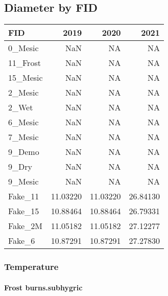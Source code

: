 \documentclass[
]{article}
\begin{document}
\hypertarget{diameter-by-fid-1}{%
\subsection{Diameter by FID}\label{diameter-by-fid-1}}

\begin{tabular}{l|r|r|r}
\hline
FID & 2019 & 2020 & 2021\\
\hline
0\_Mesic & NaN & NA & NA\\
\hline
11\_Frost & NaN & NA & NA\\
\hline
15\_Mesic & NaN & NA & NA\\
\hline
2\_Mesic & NaN & NA & NA\\
\hline
2\_Wet & NaN & NA & NA\\
\hline
6\_Mesic & NaN & NA & NA\\
\hline
7\_Mesic & NaN & NA & NA\\
\hline
9\_Demo & NaN & NA & NA\\
\hline
9\_Dry & NaN & NA & NA\\
\hline
9\_Mesic & NaN & NA & NA\\
\hline
Fake\_11 & 11.03220 & 11.03220 & 26.84130\\
\hline
Fake\_15 & 10.88464 & 10.88464 & 26.79331\\
\hline
Fake\_2M & 11.05182 & 11.05182 & 27.12277\\
\hline
Fake\_6 & 10.87291 & 10.87291 & 27.27830\\
\hline
\end{tabular}

\hypertarget{temperature-2}{%
\subsubsection{Temperature}\label{temperature-2}}

\hypertarget{frost-burns.subhygric}{%
\paragraph{Frost burns.subhygric}\label{frost-burns.subhygric}}
\end{document}
